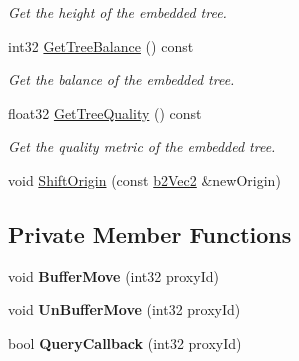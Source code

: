 \begin{DoxyCompactItemize}
\begin{DoxyCompactList}\small\item\em Get the height of the embedded tree. \end{DoxyCompactList}\item 
int32 \hyperlink{classb2_broad_phase_a1189e783d39bfd69b314284ce52ea3c3}{Get\+Tree\+Balance} () const \hypertarget{classb2_broad_phase_a1189e783d39bfd69b314284ce52ea3c3}{}\label{classb2_broad_phase_a1189e783d39bfd69b314284ce52ea3c3}

\begin{DoxyCompactList}\small\item\em Get the balance of the embedded tree. \end{DoxyCompactList}\item 
float32 \hyperlink{classb2_broad_phase_abe02c30ca1b3b9c9b84a571a2f8cef92}{Get\+Tree\+Quality} () const \hypertarget{classb2_broad_phase_abe02c30ca1b3b9c9b84a571a2f8cef92}{}\label{classb2_broad_phase_abe02c30ca1b3b9c9b84a571a2f8cef92}

\begin{DoxyCompactList}\small\item\em Get the quality metric of the embedded tree. \end{DoxyCompactList}\item 
void \hyperlink{classb2_broad_phase_a410e6115e3d1b4fca61cfbf397767772}{Shift\+Origin} (const \hyperlink{structb2_vec2}{b2\+Vec2} \&new\+Origin)
\end{DoxyCompactItemize}
\subsection*{Private Member Functions}
\begin{DoxyCompactItemize}
\item 
void {\bfseries Buffer\+Move} (int32 proxy\+Id)\hypertarget{classb2_broad_phase_a4917a3c91402339757b5edc1a07ac1f9}{}\label{classb2_broad_phase_a4917a3c91402339757b5edc1a07ac1f9}

\item 
void {\bfseries Un\+Buffer\+Move} (int32 proxy\+Id)\hypertarget{classb2_broad_phase_a5744c0e7a5cbc0bceb0fca334827ca35}{}\label{classb2_broad_phase_a5744c0e7a5cbc0bceb0fca334827ca35}

\item 
bool {\bfseries Query\+Callback} (int32 proxy\+Id)\hypertarget{classb2_broad_phase_a7c24ab9e23c062ea51d8018aee0d03f5}{}\label{classb2_broad_phase_a7c24ab9e23c062ea51d8018aee0d03f5}

\end{DoxyCompactItemize}
